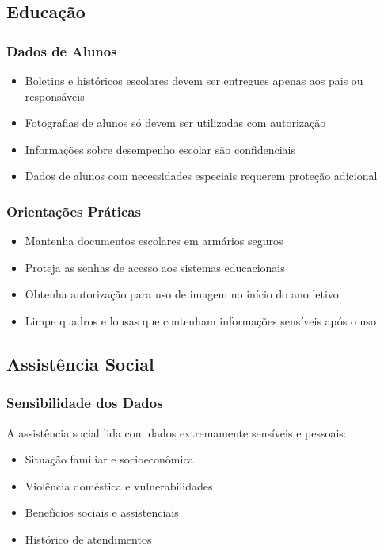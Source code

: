 \documentclass[12pt,a4paper]{article}
\begin{document}
\subsection{Educação}

\subsubsection{Dados de Alunos}
\begin{itemize}
    \item Boletins e históricos escolares devem ser entregues apenas aos pais ou responsáveis
    \item Fotografias de alunos só devem ser utilizadas com autorização
    \item Informações sobre desempenho escolar são confidenciais
    \item Dados de alunos com necessidades especiais requerem proteção adicional
\end{itemize}

\subsubsection{Orientações Práticas}
\begin{itemize}
    \item Mantenha documentos escolares em armários seguros
    \item Proteja as senhas de acesso aos sistemas educacionais
    \item Obtenha autorização para uso de imagem no início do ano letivo
    \item Limpe quadros e lousas que contenham informações sensíveis após o uso
\end{itemize}

\subsection{Assistência Social}

\subsubsection{Sensibilidade dos Dados}
A assistência social lida com dados extremamente sensíveis e pessoais:
\begin{itemize}
    \item Situação familiar e socioeconômica
    \item Violência doméstica e vulnerabilidades
    \item Benefícios sociais e assistenciais
    \item Histórico de atendimentos
\end{itemize}
\end{document}
